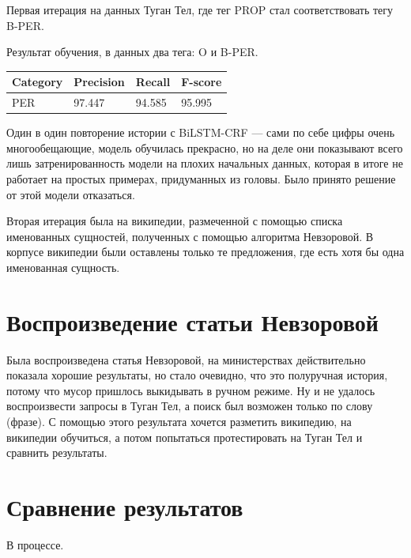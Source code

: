 Первая итерация на данных Туган Тел, где тег PROP стал соответствовать тегу B-PER.

Результат обучения, в данных два тега: O и B-PER.

\medskip

\begin{tabular}{| l | l | l | l |}
\hline
Category               & Precision  &   Recall   &  F-score     \\

\hline
 PER                                 & 97.447     & 94.585    & 95.995        \\
\hline
\end{tabular}

Один в один повторение истории с BiLSTM-CRF --- сами по себе цифры очень многообещающие, модель обучилась прекрасно, но на деле они показывают всего лишь затренированность модели на плохих начальных данных, которая в итоге не работает на простых примерах, придуманных из головы. Было принято решение от этой модели отказаться.

Вторая итерация была на википедии, размеченной с помощью списка именованных сущностей, полученных с помощью алгоритма Невзоровой. В корпусе википедии были оставлены только те предложения, где есть хотя бы одна именованная сущность. 

\section{Воспроизведение статьи Невзоровой}

Была воспроизведена статья Невзоровой, на министерствах действительно показала хорошие результаты, но стало очевидно, что это полуручная история, потому что мусор пришлось выкидывать в ручном режиме. Ну и не удалось воспроизвести запросы в Туган Тел, а поиск был возможен только по слову (фразе). С помощью этого результата хочется разметить википедию, на википедии обучиться, а потом попытаться протестировать на Туган Тел и сравнить результаты.

\section{Сравнение результатов}

В процессе.


